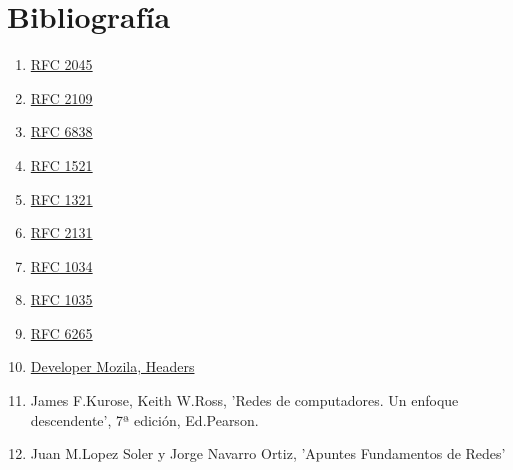 \documentclass[a4paper,11pt]{article}
\begin{document}
\section{Bibliografía}
\begin{enumerate}
\item \href{https://tools.ietf.org/html/rfc2045#page-5}{RFC 2045}
\item \href{https://tools.ietf.org/html/rfc2109}{RFC 2109}
\item \href{https://tools.ietf.org/html/rfc6838}{RFC 6838}
\item \href{https://tools.ietf.org/html/rfc1521#page-9}{RFC 1521}
\item \href{https://tools.ietf.org/html/rfc1321}{RFC 1321}
\item \href{https://tools.ietf.org/html/rfc2131#section-4.3}{RFC 2131}
\item \href{https://tools.ietf.org/html/rfc1034}{RFC 1034}
\item \href{https://tools.ietf.org/html/rfc1035}{RFC 1035}
\item \href{https://tools.ietf.org/html/rfc6265#section-5.2}{RFC 6265}
\item \href{https://developer.mozilla.org/es/docs/Web/HTTP/Headers}{Developer Mozila, Headers}
\item James F.Kurose, Keith W.Ross, 'Redes de computadores. Un enfoque descendente', 7ª edición, Ed.Pearson.
\item {Juan M.Lopez Soler y Jorge Navarro Ortiz, 'Apuntes Fundamentos de Redes'}

\end{enumerate}
\end{document}
